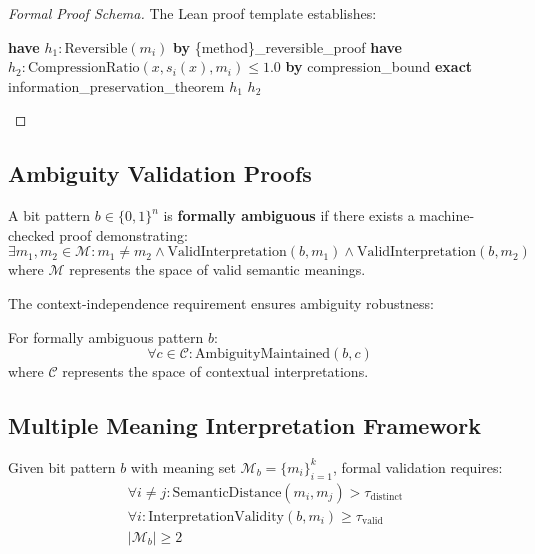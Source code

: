 \begin{proof}[Formal Proof Schema]
The Lean proof template establishes:
\begin{algorithmic}[1]
\STATE \textbf{have} $h_1: \text{Reversible}(m_i)$ \textbf{by} \{method\}\_reversible\_proof
\STATE \textbf{have} $h_2: \text{CompressionRatio}(x, s_i(x), m_i) \leq 1.0$ \textbf{by} compression\_bound
\STATE \textbf{exact} information\_preservation\_theorem $h_1$ $h_2$
\end{algorithmic}
\end{proof}

\subsection{Ambiguity Validation Proofs}

\begin{definition}
A bit pattern $b \in \{0,1\}^n$ is \textbf{formally ambiguous} if there exists a machine-checked proof demonstrating:
\begin{equation}
\exists m_1, m_2 \in \mathcal{M}: m_1 \neq m_2 \land \text{ValidInterpretation}(b, m_1) \land \text{ValidInterpretation}(b, m_2)
\label{eq:formal-ambiguity}
\end{equation}
where $\mathcal{M}$ represents the space of valid semantic meanings.
\end{definition}

The context-independence requirement ensures ambiguity robustness:

\begin{theorem}
For formally ambiguous pattern $b$:
\begin{equation}
\forall c \in \mathcal{C}: \text{AmbiguityMaintained}(b, c)
\label{eq:context-independence}
\end{equation}
where $\mathcal{C}$ represents the space of contextual interpretations.
\end{theorem}

\subsection{Multiple Meaning Interpretation Framework}

\begin{definition}
Given bit pattern $b$ with meaning set $\mathcal{M}_b = \{m_i\}_{i=1}^k$, formal validation requires:
\begin{align}
&\forall i \neq j: \text{SemanticDistance}(m_i, m_j) > \tau_{\text{distinct}} \label{eq:meaning-separation}\\
&\forall i: \text{InterpretationValidity}(b, m_i) \geq \tau_{\text{valid}} \label{eq:interpretation-validity}\\
&|\mathcal{M}_b| \geq 2 \label{eq:minimum-meanings}
\end{align}
\end{definition}

